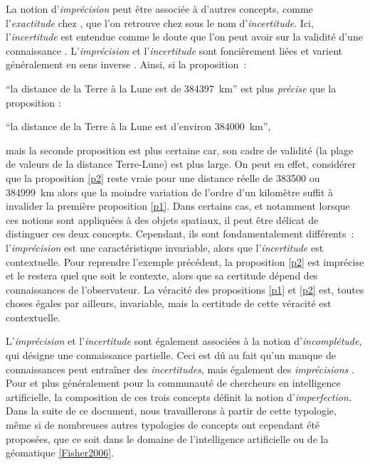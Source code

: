 La notion d’\emph{imprécision} peut être associée à d’autres concepts,
comme l’\emph{exactitude} chez \textcite{Russell1923}, que l’on
retrouve chez \textcite{Bouchon-Meunier1995, Bouchon-Meunier2007} sous
le nom d’\emph{incertitude}. Ici, l’\emph{incertitude} est entendue
comme le doute que l’on peut avoir sur la validité d’une connaissance
\autocite{Bouchon-Meunier1995}. L’\emph{imprécision} et
l’\emph{incertitude} sont foncièrement liées et varient généralement
en sens inverse \autocite{Russell1923}. Ainsi, si la proposition :
%
\begin{enumerate*}[label=(\alph*)]
\item \enquote{la distance de la Terre à la Lune est de
    \SI{384397}{\kilo\meter}} est plus \emph{précise} que la
  proposition : \label{p1}
\item \enquote{la distance de la Terre à la Lune est d’environ
\SI{384000}{\kilo\meter}}, \label{p2}
\end{enumerate*}
%
mais la seconde proposition est plus \textsf{certaine} car, son cadre
de validité (la plage de valeurs de la distance Terre-Lune) est plus
large. On peut en effet, considérer que la proposition \ref{p2} reste
vraie pour une distance réelle de \num{383500} ou
\SI{384999}{\kilo\meter} alors que la moindre variation de l’ordre
d’un kilomètre suffit à invalider la première proposition
\ref{p1}. Dans certains cas, et notamment lorsque ces notions sont
appliquées à des objets spatiaux, il peut être délicat de distinguer
ces deux concepts. Cependant, ils sont fondamentalement différents :
l’\emph{imprécision} est une caractéristique invariable, alors que
l’\emph{incertitude} est contextuelle. Pour reprendre l’exemple
précédent, la proposition \ref{p2} est imprécise et le restera quel
que soit le contexte, alors que sa certitude dépend des connaissances
de l’observateur. La véracité des propositions \ref{p1} et \ref{p2}
est, toutes choses égales par ailleurs, invariable, mais la certitude
de cette véracité est contextuelle.

L’\emph{imprécision} et l’\emph{incertitude} sont également associées
à la notion d’\emph{incomplétude}, qui désigne une connaissance
partielle. Ceci est dû au fait qu’un manque de connaissances peut
entraîner des \emph{incertitudes}, mais également des
\emph{imprécisions}
\autocite{Bouchon-Meunier1995,Bouchon-Meunier2007}. Pour
\textcite{Bouchon-Meunier1995} et plus généralement pour la communauté
de chercheurs en intelligence artificielle, la composition de ces
trois concepts définit la notion d’\emph{imperfection.} Dans la suite
de ce document, nous travaillerons à partir de cette typologie, même
si de nombreuses autres typologies de concepts ont cependant été
proposées, que ce soit dans le domaine de l’intelligence artificielle
ou de la géomatique \autoref{Fisher2006}.

